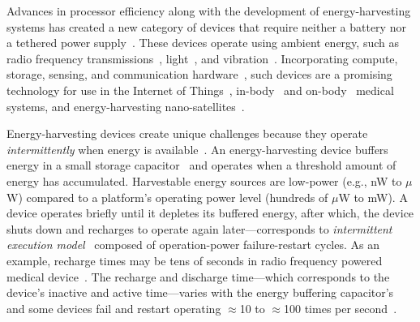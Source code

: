 

Advances in processor efficiency along with the development of
energy-harvesting systems has created a new category of devices that require
neither a battery nor a tethered power
supply~\citep{prasad_comst_2014,lucia_snapl_2017,soyata_csm_2016}. These
devices operate using ambient energy, such as radio frequency
transmissions~\citep{rf_powered_computing_gollakota_2014},
light~\citep{margolies_infocom_2016,margolies_tosn_2016}, and
vibration~\citep{gorlatova_sigmetrics_2014}. Incorporating compute, storage,
sensing, and communication hardware~\citep{wisp5,moo,capybara}, such devices are a
promising technology for use in the Internet of Things~\citep{ku_cst_2016},
in-body~\citep{nadeau_naturebio_2017} and
on-body~\citep{bandodkar_electroanalysis_2015} medical systems, and
energy-harvesting nano-satellites~\citep{kicksat,capybara}.

Energy-harvesting devices create unique challenges because they operate {\em
intermittently} when energy is
available~\citep{hicks_isca_2017,lucia_snapl_2017}. An energy-harvesting device
buffers energy in a small storage capacitor~\citep{gorlatova_tmc_2013,gunduz_commag_2014} and operates when a
threshold amount of energy has accumulated. Harvestable energy sources are low-power (e.g., nW to $\mu$W) compared to a platform's operating
power level (hundreds of $\mu$W to mW). A device operates briefly until it depletes its buffered energy, after which, the device shuts
down and recharges to operate again later---corresponds to {\em intermittent execution model}~\citep{dino,lucia_snapl_2017} composed of
operation-power failure-restart cycles. As an example, recharge times may be
tens of seconds in radio frequency powered medical device~\cite[Fig.
3c]{nadeau_naturebio_2017}.  The recharge and discharge time---which corresponds to the device's inactive and active time---varies with the energy buffering capacitor's~\cite{capybara} and some devices fail and restart operating $\approx$10 to
$\approx$100 times per second~\citep{tan_infocom_2016,mementos,nvp}.  

